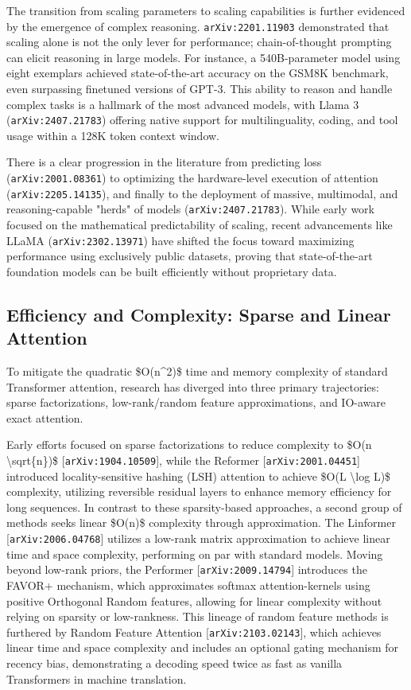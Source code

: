 \documentclass[11pt]{article}
\begin{document}
The transition from scaling parameters to scaling capabilities is further evidenced by the emergence of complex reasoning. \texttt{arXiv:2201.11903} demonstrated that scaling alone is not the only lever for performance; chain-of-thought prompting can elicit reasoning in large models. For instance, a 540B-parameter model using eight exemplars achieved state-of-the-art accuracy on the GSM8K benchmark, even surpassing finetuned versions of GPT-3. This ability to reason and handle complex tasks is a hallmark of the most advanced models, with Llama 3 (\texttt{arXiv:2407.21783}) offering native support for multilinguality, coding, and tool usage within a 128K token context window.

There is a clear progression in the literature from predicting loss (\texttt{arXiv:2001.08361}) to optimizing the hardware-level execution of attention (\texttt{arXiv:2205.14135}), and finally to the deployment of massive, multimodal, and reasoning-capable "herds" of models (\texttt{arXiv:2407.21783}). While early work focused on the mathematical predictability of scaling, recent advancements like LLaMA (\texttt{arXiv:2302.13971}) have shifted the focus toward maximizing performance using exclusively public datasets, proving that state-of-the-art foundation models can be built efficiently without proprietary data.

\subsection{Efficiency and Complexity: Sparse and Linear Attention}

To mitigate the quadratic \$O(n\textasciicircum{}2)\$ time and memory complexity of standard Transformer attention, research has diverged into three primary trajectories: sparse factorizations, low-rank/random feature approximations, and IO-aware exact attention.

Early efforts focused on sparse factorizations to reduce complexity to \$O(n \textbackslash{}sqrt\{n\})\$ [\texttt{arXiv:1904.10509}], while the Reformer [\texttt{arXiv:2001.04451}] introduced locality-sensitive hashing (LSH) attention to achieve \$O(L \textbackslash{}log L)\$ complexity, utilizing reversible residual layers to enhance memory efficiency for long sequences. In contrast to these sparsity-based approaches, a second group of methods seeks linear \$O(n)\$ complexity through approximation. The Linformer [\texttt{arXiv:2006.04768}] utilizes a low-rank matrix approximation to achieve linear time and space complexity, performing on par with standard models. Moving beyond low-rank priors, the Performer [\texttt{arXiv:2009.14794}] introduces the FAVOR+ mechanism, which approximates softmax attention-kernels using positive Orthogonal Random features, allowing for linear complexity without relying on sparsity or low-rankness. This lineage of random feature methods is furthered by Random Feature Attention [\texttt{arXiv:2103.02143}], which achieves linear time and space complexity and includes an optional gating mechanism for recency bias, demonstrating a decoding speed twice as fast as vanilla Transformers in machine translation.
\end{document}
